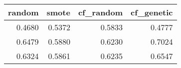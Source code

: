 \begin{tabular}{rrrr}
\toprule
 random &  smote &  cf\_random &  cf\_genetic \\
\midrule
 0.4680 & 0.5372 &     0.5833 &      0.4777 \\
 0.6479 & 0.5880 &     0.6230 &      0.7024 \\
 0.6324 & 0.5861 &     0.6235 &      0.6547 \\
\bottomrule
\end{tabular}
